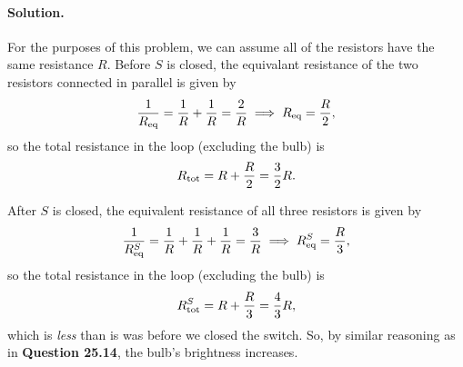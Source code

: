 \documentclass[11pt]{article}
\newcommand{\beq}{\begin{equation*}}
\newcommand{\eeq}{\end{equation*}}
\newenvironment{solution}
{
    \paragraph{Solution.}
    \ignorespaces
}
{
    \bigskip
}
\begin{document}
\begin{solution}
	For the purposes of this problem, we can assume all of the resistors have the same resistance $R$.  Before $S$ is closed, the equivalant resistance of the two resistors connected in parallel is given by
	\beq
		\frac{1}{\Req} = \frac{1}{R} + \frac{1}{R} = \frac{2}{R}
		\implies
		\Req = \frac{R}{2},
	\eeq
	so the total resistance in the loop (excluding the bulb) is
	\beq
		\Rtot = R + \frac{R}{2} = \frac{3}{2} R.
	\eeq
	
	After $S$ is closed, the equivalent resistance of all three resistors is given by
		\beq
		\frac{1}{\Req^S} = \frac{1}{R} + \frac{1}{R} + \frac{1}{R} = \frac{3}{R}
		\implies
		\Req^S = \frac{R}{3},
	\eeq
	so the total resistance in the loop (excluding the bulb) is
	\beq
		\Rtot^S = R + \frac{R}{3} = \frac{4}{3} R,
	\eeq
	which is \emph{less} than is was before we closed the switch.  So, by similar reasoning as in \textbf{Question 25.14}, the bulb's brightness increases.
\end{solution}


\clearpage

\newcommand{\Ceq}{C_\text{eq}}
\newcommand{\ssa}{^{(\text{a})}}
\newcommand{\ssb}{^{(\text{b})}}
\end{document}
